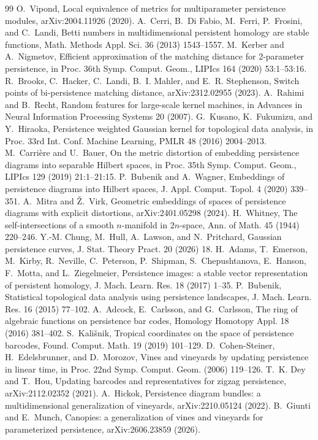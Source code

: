 \documentclass[11pt]{article}
\theoremstyle{definition}
\begin{document}
\begin{thebibliography}{99}
 O.~Vipond, Local equivalence of metrics for multiparameter persistence modules, arXiv:2004.11926 (2020).
 A.~Cerri, B.~Di Fabio, M.~Ferri, P.~Frosini, and C.~Landi, Betti numbers in multidimensional persistent homology are stable functions, Math. Methods Appl. Sci. 36 (2013) 1543--1557.
 M.~Kerber and A.~Nigmetov, Efficient approximation of the matching distance for 2-parameter persistence, in Proc. 36th Symp. Comput. Geom., LIPIcs 164 (2020) 53:1--53:16.
 R.~Brooks, C.~Hacker, C.~Landi, B.~I. Mahler, and E.~R. Stephenson, Switch points of bi-persistence matching distance, arXiv:2312.02955 (2023).
 A.~Rahimi and B.~Recht, Random features for large-scale kernel machines, in Advances in Neural Information Processing Systems 20 (2007).
 G.~Kusano, K.~Fukumizu, and Y.~Hiraoka, Persistence weighted Gaussian kernel for topological data analysis, in Proc. 33rd Int. Conf. Machine Learning, PMLR 48 (2016) 2004--2013.
 M.~Carri\`ere and U.~Bauer, On the metric distortion of embedding persistence diagrams into separable Hilbert spaces, in Proc. 35th Symp. Comput. Geom., LIPIcs 129 (2019) 21:1--21:15.
 P.~Bubenik and A.~Wagner, Embeddings of persistence diagrams into Hilbert spaces, J. Appl. Comput. Topol. 4 (2020) 339--351.
 A.~Mitra and \v Z.~Virk, Geometric embeddings of spaces of persistence diagrams with explicit distortions, arXiv:2401.05298 (2024).
 H.~Whitney, The self-intersections of a smooth $n$-manifold in $2n$-space, Ann. of Math. 45 (1944) 220--246.
 Y.-M. Chung, M.~Hull, A.~Lawson, and N.~Pritchard, Gaussian persistence curves, J. Stat. Theory Pract. 20 (2026) 18.
 H.~Adams, T.~Emerson, M.~Kirby, R.~Neville, C.~Peterson, P.~Shipman, S.~Chepushtanova, E.~Hanson, F.~Motta, and L.~Ziegelmeier, Persistence images: a stable vector representation of persistent homology, J. Mach. Learn. Res. 18 (2017) 1--35.
 P.~Bubenik, Statistical topological data analysis using persistence landscapes, J. Mach. Learn. Res. 16 (2015) 77--102.
 A.~Adcock, E.~Carlsson, and G.~Carlsson, The ring of algebraic functions on persistence bar codes, Homology Homotopy Appl. 18 (2016) 381--402.
 S.~Kali\v snik, Tropical coordinates on the space of persistence barcodes, Found. Comput. Math. 19 (2019) 101--129.
 D.~Cohen-Steiner, H.~Edelsbrunner, and D.~Morozov, Vines and vineyards by updating persistence in linear time, in Proc. 22nd Symp. Comput. Geom. (2006) 119--126.
 T.~K. Dey and T.~Hou, Updating barcodes and representatives for zigzag persistence, arXiv:2112.02352 (2021).
 A.~Hickok, Persistence diagram bundles: a multidimensional generalization of vineyards, arXiv:2210.05124 (2022).
 B.~Giunti and E.~Munch, Canopies: a generalization of vines and vineyards for parameterized persistence, arXiv:2606.23859 (2026).


\end{thebibliography}
\end{document}
